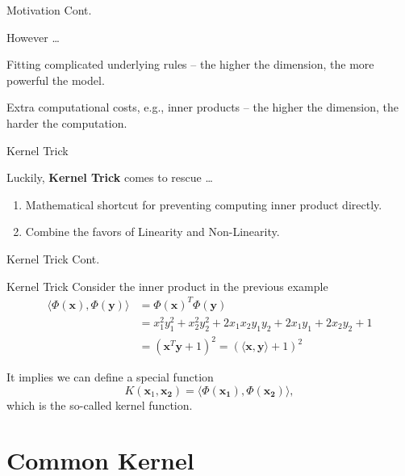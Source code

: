 \documentclass[10pt, compress]{beamer}
\begin{document}
\begin{frame}[fragile]{Motivation Cont.}

  However \dots
  \begin{description}[<+- | alert@+>]
    \item[Pros] Fitting complicated underlying rules -- the higher the dimension, the more powerful the model.
    \item[Cons] Extra computational costs, e.g., inner products -- the higher the dimension, the harder the computation.
  \end{description}
\end{frame}


\begin{frame}[fragile]{Kernel Trick}

  Luckily, \textbf{Kernel Trick} comes to rescue \dots
  \begin{enumerate}[<+- | alert@+>]
    \item Mathematical shortcut for preventing computing inner product directly.
    \item Combine the favors of Linearity and Non-Linearity.
  \end{enumerate}
\end{frame}

\begin{frame}[fragile]{Kernel Trick Cont.}

  \begin{block}{Kernel Trick}
    Consider the inner product in the previous example
    \begin{align*}
      \langle \Phi(\mathbf{x}), \Phi(\mathbf{y}) \rangle &= {\Phi(\mathbf{x})}^T \Phi(\mathbf{y}) \\
          &= x_1^2 y_1^2 + x_2^2 y_2^2 + 2 x_1 x_2 y_1 y_2 + 2 x_1 y_1 + 2 x_2 y_2 + 1 \\
          &= {(\mathbf{x}^T\mathbf{y} + 1)}^2 = {(\langle \mathbf{x}, \mathbf{y} \rangle + 1)}^2
    \end{align*}

    It implies we can define a special function
    \[
      K(\mathbf{x}_1, \mathbf{x_2}) = \langle \Phi(\mathbf{x_1}), \Phi(\mathbf{x_2}) \rangle,
    \]
    which is the so-called kernel function.

  \end{block}

\end{frame}

\section{Common Kernel}
\end{document}
